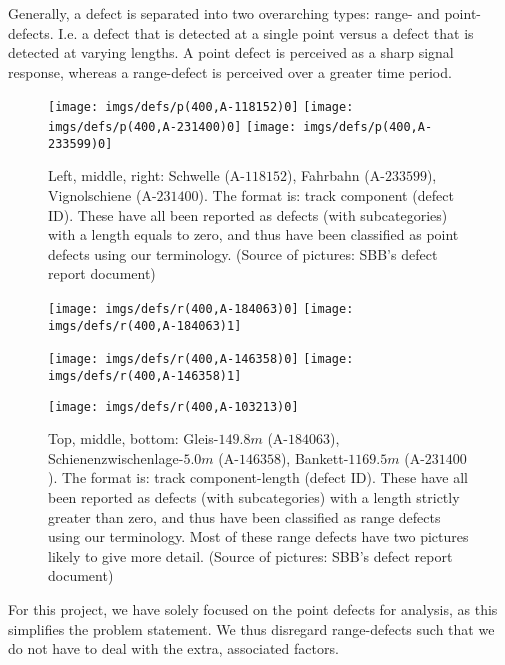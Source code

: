 Generally, a defect is separated into two overarching types: range- and point-defects. I.e. a defect that is detected at a single point versus a defect that is detected at varying lengths. A point defect is perceived as a sharp signal response, whereas a range-defect is perceived over a greater time period. 
\begin{figure}[H]
	\centering
	\texttt{[image: imgs/defs/p(400,A-118152)0]}
	\texttt{[image: imgs/defs/p(400,A-231400)0]}
	\texttt{[image: imgs/defs/p(400,A-233599)0]}
	\caption{Left, middle, right: Schwelle (A-$118152$), Fahrbahn (A-$233599$), Vignolschiene (A-$231400$). The format is: track component (defect ID). These have all been reported as defects (with subcategories) with a length equals to zero, and thus have been classified as point defects using our terminology. (Source of pictures: SBB's defect report document)}
\end{figure}
\raggedbottom
\begin{figure}[H]
	\centering
	\texttt{[image: imgs/defs/r(400,A-184063)0]}
	\texttt{[image: imgs/defs/r(400,A-184063)1]}
	
	\texttt{[image: imgs/defs/r(400,A-146358)0]}
	\texttt{[image: imgs/defs/r(400,A-146358)1]}
\end{figure}
\begin{figure}[H]
	\centering
	\texttt{[image: imgs/defs/r(400,A-103213)0]}
	\caption{Top, middle, bottom: Gleis-$149.8 m$ (A-$184063$), Schienenzwischenlage-$5.0 m$ (A-$146358$), Bankett-$1169.5 m$ (A-$231400$). The format is: track component-length (defect ID). These have all been reported as defects (with subcategories) with a length strictly greater than zero, and thus have been classified as range defects using our terminology. Most of these range defects have two pictures likely to give more detail. (Source of pictures: SBB's defect report document)}
\end{figure}
\raggedbottom %
For this project, we have solely focused on the point defects for analysis, as this simplifies the problem statement. We thus disregard range-defects such that we do not have to deal with the extra, associated factors. 

